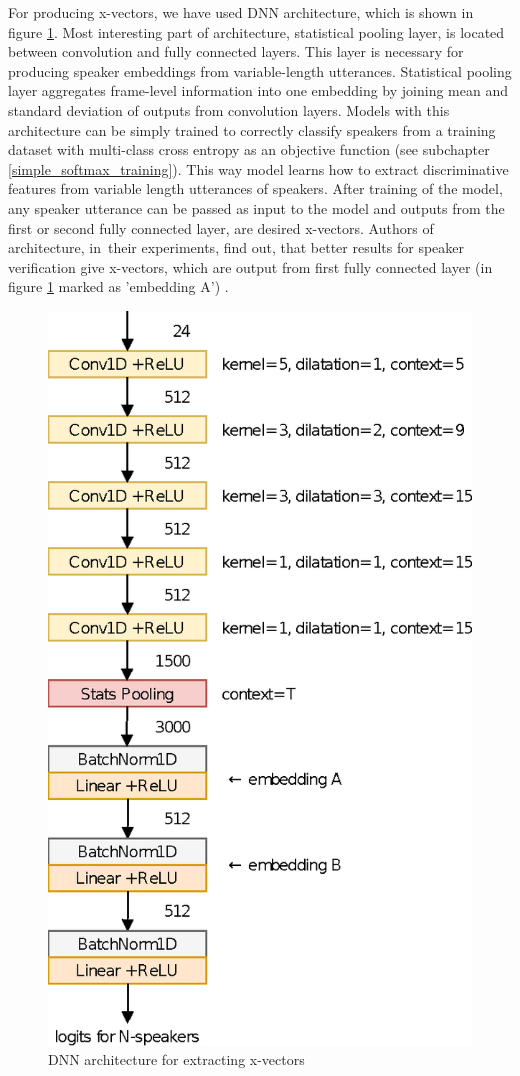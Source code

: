 For producing x-vectors, we have used DNN architecture, which is shown in figure \ref{fig:x-vectors_architecture}. Most interesting part of architecture, statistical pooling layer, is located between convolution and fully connected layers. This layer is necessary for producing speaker embeddings from variable-length utterances. Statistical pooling layer aggregates frame-level information into one embedding by joining mean and standard deviation of outputs from convolution layers. Models with this architecture can be simply trained to correctly classify speakers from a training dataset with multi-class cross entropy as an objective function (see subchapter \ref{simple_softmax_training}). This way model learns how to extract discriminative features from variable length utterances of speakers. After training of the model, any speaker utterance can be passed as input to the model and outputs from the first or second fully connected layer, are desired x-vectors. Authors of architecture, in~their experiments, find out, that better results for speaker verification give x-vectors, which are output from first fully connected layer (in figure \ref{fig:x-vectors_architecture} marked as 'embedding A') \cite{x_vectors}.

\begin{figure}[h]
    \centering
    \includegraphics[height=0.5\textwidth]{x-vectors-diag.eps}
    \caption{DNN architecture for extracting x-vectors}
    \label{fig:x-vectors_architecture}
\end{figure}
